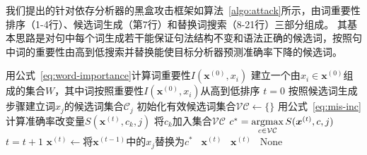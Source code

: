 我们提出的针对依存分析器的黑盒攻击框架如算法~\ref{algo:attack}所示，由词重要性排序（1-4行）、候选词生成（第7行）和替换词搜索（8-21行）三部分组成。
其基本思路是对句中每个词生成若干能保证句法结构不变和语法正确的候选词，按照句中词的重要性由高到低搜索并替换能使目标分析器预测准确率下降的候选词。


\begin{algorithm}[!h]
    \wuhao
	\LinesNumbered %
		{
		    用公式~\ref{eq:word-importance}计算词重要性$I(\bm{x}^{(0)},x_i)$\;
		}
		建立一个由$x_i\in\bm{x}^{(0)}$组成的集合$W$，其中词按照重要性$I(\bm{x}^{(0)},x_i)$从高到低排序\;
		$t=0$\;
		{
		    按照候选词生成步骤建立词$x_j$的候选词集合$\mathcal{C}_j$\;
		    初始化有效候选词集合$\mathcal{VC} \leftarrow \{\}$\;
		    {
		        用公式~\ref{eq:mis-inc}计算准确率改变量$S(\bm{x}^{(t)},c_k,j)$\;
		        {
		            将$c_k$加入集合$\mathcal{VC}$
		        }
		    }
		}
		{
		    $c^* = \operatorname*{argmax}\limits_{c \in \mathcal{VC}} S(\bm{x}^{(t)},c,j)$\;
    		$t = t + 1$\;
    		$\bm{x}^{(t)} \leftarrow \text{将} \bm{x}^{(t-1)} \text{中的} x_j  \text{替换为} c^*$\;
    		{
    		    \algorithmicreturn\ $\bm{x}^{(t)}$
    		}
		}
		{
		    \algorithmicreturn\ $\bm{x}^{(t)}$
		}
		{
		    \algorithmicreturn\ None
		}
	\label{algo:attack}
\end{algorithm}


